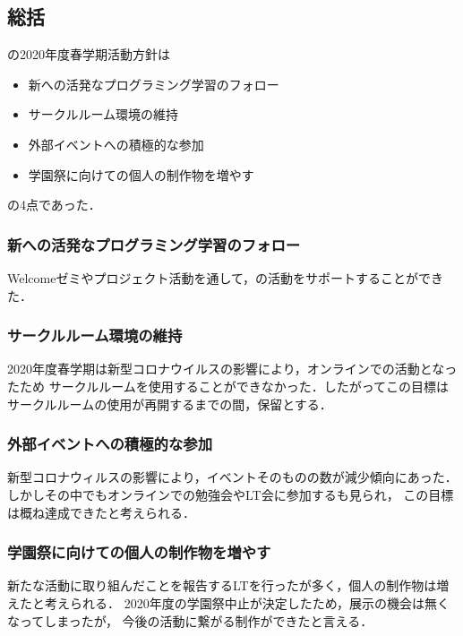 \subsection*{\secondGrade{}総括}

\secondGrade{}の2020年度春学期活動方針は
\begin{itemize}
    \item 新\firstGrade{}への活発なプログラミング学習のフォロー
    \item サークルルーム環境の維持
    \item 外部イベントへの積極的な参加
    \item 学園祭に向けての個人の制作物を増やす
\end{itemize}
の4点であった．

\subsubsection*{ 新\firstGrade{}への活発なプログラミング学習のフォロー}
Welcomeゼミやプロジェクト活動を通して，\firstGrade{}の活動をサポートすることができた．

\subsubsection*{サークルルーム環境の維持}
2020年度春学期は新型コロナウイルスの影響により，オンラインでの活動となったため
サークルルームを使用することができなかった．したがってこの目標はサークルルームの使用が再開するまでの間，保留とする．

\subsubsection*{外部イベントへの積極的な参加}
新型コロナウィルスの影響により，イベントそのものの数が減少傾向にあった．
しかしその中でもオンラインでの勉強会やLT会に参加する\secondGrade{}も見られ，
この目標は概ね達成できたと考えられる．

\subsubsection*{学園祭に向けての個人の制作物を増やす}
新たな活動に取り組んだことを報告するLTを行った\secondGrade{}が多く，個人の制作物は増えたと考えられる．
2020年度の学園祭中止が決定したため，展示の機会は無くなってしまったが，
今後の活動に繋がる制作ができたと言える．

